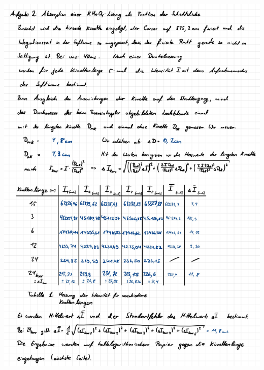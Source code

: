 \documentclass{article}
\begin{document}
\newpage
\includegraphics[width=\textwidth]{graphics/mess3.jpg}
\newpage
\end{document}
